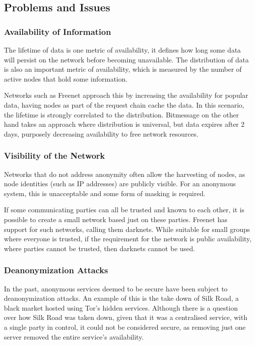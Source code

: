 	\subsection{Problems and Issues}
		\subsubsection*{Availability of Information}
			The lifetime of data is one metric of availability, it defines how long some data will persist on the network before becoming unavailable. The distribution of data is also an important metric of availability, which is measured by the number of active nodes that hold some information.
			
			Networks such as Freenet approach this by increasing the availability for popular data, having nodes as part of the request chain cache the data. In this scenario, the lifetime is strongly correlated to the distribution. Bitmessage on the other hand takes an approach where distribution is universal, but data expires after 2 days, purposely decreasing availability to free network resources.
		\subsubsection*{Visibility of the Network}
			Networks that do not address anonymity often allow the harvesting of nodes, as node identities (such as IP addresses) are publicly visible. For an anonymous system, this is unacceptable and some form of masking is required.
			
			If some communicating parties can all be trusted and known to each other, it is possible to create a small network based just on these parties. Freenet has support for such networks, calling them darknets. While suitable for small groups where everyone is trusted, if the requirement for the network is public availability, where parties cannot be trusted, then darknets cannot be used.
		\subsubsection*{Deanonymization Attacks}
			In the past, anonymous services deemed to be secure have been subject to deanonymization attacks. An example of this is the take down of Silk Road, a black market hosted using Tor's hidden services. Although there is a question over how Silk Road was taken down, given that it was a centralised service, with a single party in control, it could not be considered secure, as removing just one server removed the entire service's availability. 
